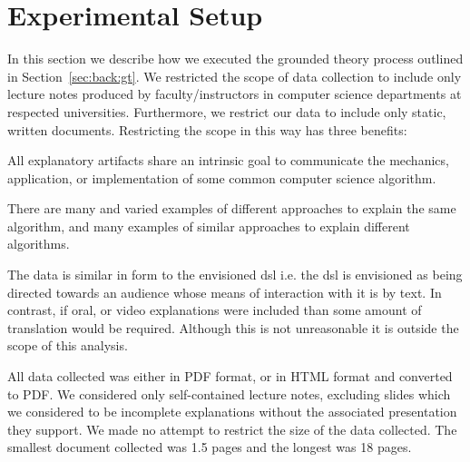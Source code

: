 \documentclass[sigconf]{acmart}
\begin{document}
%


\section{Experimental Setup}
\label{sec:exp:setup}

In this section we describe how we executed the grounded theory process
outlined in Section~\ref{sec:back:gt}.
%
We restricted the scope of data collection to include only lecture notes
produced by faculty/instructors in computer science departments at respected
universities. Furthermore, we restrict our data to include only static, written
documents. Restricting the scope in this way has three benefits:
%
\begin{enumerate*}
%
\item All explanatory artifacts share an intrinsic goal to communicate the
mechanics, application, or implementation of some common computer science
algorithm.
%
\item There are many and varied examples of different approaches to explain the
same algorithm, and many examples of similar approaches to explain different
algorithms.
%
\item The data is similar in form to the envisioned dsl i.e. the dsl is
  envisioned as being directed towards an audience whose means of interaction
  with it is by text. In contrast, if oral, or video explanations were included
  than some amount of translation would be required. Although this is not
  unreasonable it is outside the scope of this analysis.
  
\end{enumerate*}
%
All data collected was either in PDF format, or in HTML format and converted to
PDF. We considered only self-contained lecture notes, excluding slides which we
considered to be incomplete explanations without the associated presentation
they support. 
%
We made no attempt to restrict the size of the data collected. The smallest
document collected was 1.5 pages and the longest was 18 pages.
\end{document}
